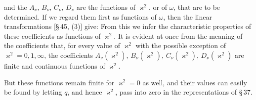and the $A_\nu$, $B_\nu$, $C_\nu$, $D_\nu$ are the functions of $\varkappa^2$, or of $\omega$, that are to be determined. If we regard them first as functions of $\omega$, then the linear transformations [\S\,45, (3)] give:
From this we infer the characteristic properties of these coefficients as functions of $\varkappa^2$. It is evident at once from the meaning of the coefficients that, for every value of $\varkappa^2$ with the possible exception of $\varkappa^2 = 0, 1, \infty$, the coefficients $A_\nu(\varkappa^2)$, $B_\nu(\varkappa^2)$, $C_\nu(\varkappa^2)$, $D_\nu(\varkappa^2)$ are finite and continuous functions of $\varkappa^2$.

But these functions remain finite for $\varkappa^2 = 0$ as well, and their values can easily be found by letting $q$, and hence $\varkappa^2$, pass into zero in the representations of \S\,37.
